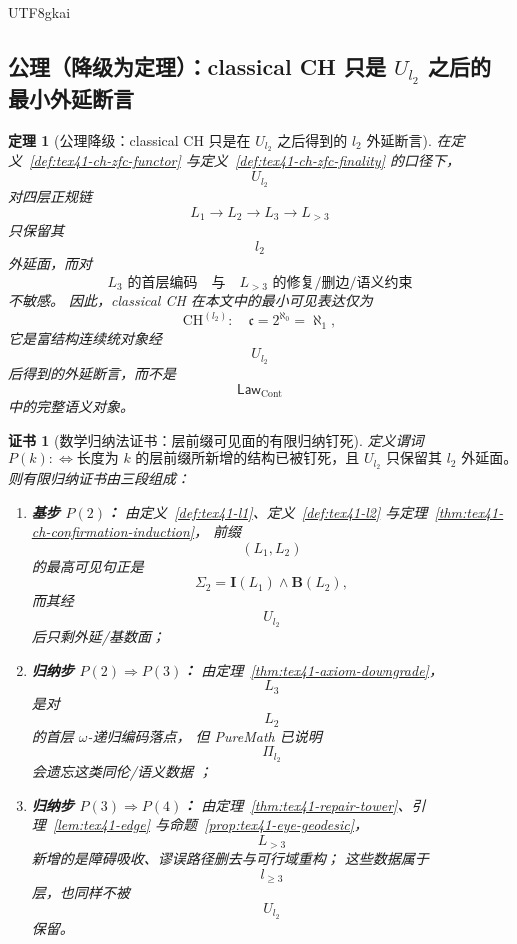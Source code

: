 \documentclass[12pt]{article}
\newtheorem{theorem}{定理}[section]
\newtheorem{Certificate}{证书}[section]
\newcommand{\LawCont}{\mathsf{Law}_{\mathrm{Cont}}}
\newcommand{\ForgetLtwo}{U_{l_2}}
\newcommand{\ProjLtwo}{\Pi_{l_2}}
\newcommand{\CHltwo}{\mathrm{CH}^{(l_2)}}
\begin{document}
\begin{CJK*}{UTF8}{gkai}
\subsection{公理（降级为定理）：classical CH 只是 $U_{l_2}$ 之后的最小外延断言}
\label{subsec:tex41-ch-zfc-axiom}

\begin{theorem}[公理降级：classical CH 只是在 $\ForgetLtwo$ 之后得到的 $l_2$ 外延断言]
\label{thm:tex41-ch-zfc-axiom}
在定义~\ref{def:tex41-ch-zfc-functor} 与定义~\ref{def:tex41-ch-zfc-finality} 的口径下，
\[
  \ForgetLtwo
\]
对四层正规链
\[
  L_1\to L_2\to L_3\to L_{>3}
\]
只保留其
\[
  l_2
\]
外延面，而对
\[
  L_3\text{ 的首层编码}
  \quad\text{与}\quad
  L_{>3}\text{ 的修复/删边/语义约束}
\]
不敏感。
因此，classical CH 在本文中的最小可见表达仅为
\[
  \CHltwo:\quad \mathfrak c=2^{\aleph_0}=\aleph_1,
\]
它是富结构连续统对象经
\[
  \ForgetLtwo
\]
后得到的外延断言，而不是
\[
  \LawCont
\]
中的完整语义对象。
\end{theorem}

\begin{Certificate}[数学归纳法证书：层前缀可见面的有限归纳钉死]
\label{cert:tex41-ch-zfc-axiom}
定义谓词
\[
  P(k)
  :
  \Longleftrightarrow
  \text{长度为 }k\text{ 的层前缀所新增的结构已被钉死，且 }\ForgetLtwo\text{ 只保留其 }l_2\text{ 外延面。}
\]
则有限归纳证书由三段组成：
\begin{enumerate}
  \item \textbf{基步 $P(2)$：}
  由定义~\ref{def:tex41-l1}、定义~\ref{def:tex41-l2} 与定理~\ref{thm:tex41-ch-confirmation-induction}，
  前缀
  \[
    (L_1,L_2)
  \]
  的最高可见句正是
  \[
    \Sigma_2=\mathbf I(L_1)\wedge \mathbf B(L_2),
  \]
  而其经
  \[
    \ForgetLtwo
  \]
  后只剩外延/基数面；
  \item \textbf{归纳步 $P(2)\Rightarrow P(3)$：}
  由定理~\ref{thm:tex41-axiom-downgrade}，
  \[
    L_3
  \]
  是对
  \[
    L_2
  \]
  的首层 $\omega$-递归编码落点，
  但 PureMath 已说明
  \[
    \ProjLtwo
  \]
  会遗忘这类同伦/语义数据
  \cite{GaoZheng2025GFramework}；
  \item \textbf{归纳步 $P(3)\Rightarrow P(4)$：}
  由定理~\ref{thm:tex41-repair-tower}、引理~\ref{lem:tex41-edge} 与命题~\ref{prop:tex41-eye-geodesic}，
  \[
    L_{>3}
  \]
  新增的是障碍吸收、谬误路径删去与可行域重构；
  这些数据属于
  \[
    l_{\ge3}
  \]
  层，也同样不被
  \[
    \ForgetLtwo
  \]
  保留。
\end{enumerate}
\end{Certificate}


\end{CJK*}
\end{document}
